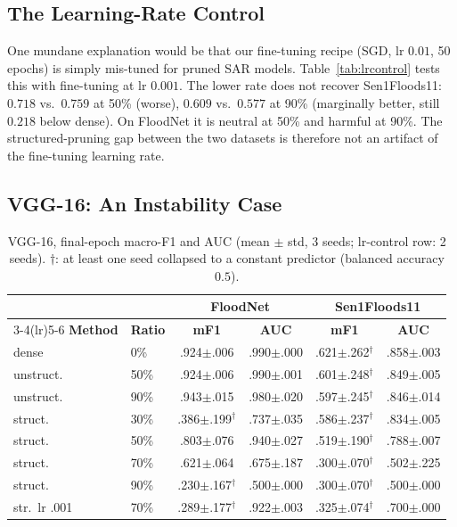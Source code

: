 \documentclass[conference]{IEEEtran}
\begin{document}
\subsection{The Learning-Rate Control}
One mundane explanation would be that our fine-tuning recipe (SGD, lr
$0.01$, 50 epochs) is simply mis-tuned for pruned SAR models.
Table~\ref{tab:lrcontrol} tests this with fine-tuning at lr $0.001$.
The lower rate does not recover Sen1Floods11: $0.718$ vs.\ $0.759$ at
50\% (worse), $0.609$ vs.\ $0.577$ at 90\% (marginally better, still
$0.218$ below dense). On FloodNet it is neutral at 50\% and harmful at
90\%. The structured-pruning gap between the two datasets is therefore
not an artifact of the fine-tuning learning rate.

\subsection{VGG-16: An Instability Case}
\begin{table}[t]
\centering
\caption{VGG-16, final-epoch macro-F1 and AUC (mean $\pm$ std, 3
seeds; lr-control row: 2 seeds). $\dagger$: at least one seed
collapsed to a constant predictor (balanced accuracy $0.5$).}
\label{tab:vgg}
\footnotesize
\setlength{\tabcolsep}{2.6pt}
\begin{tabular}{llcc cc}
\toprule
& & \multicolumn{2}{c}{\textbf{FloodNet}} &
\multicolumn{2}{c}{\textbf{Sen1Floods11}}\\
\cmidrule(lr){3-4}\cmidrule(lr){5-6}
\textbf{Method} & \textbf{Ratio} & \textbf{mF1} & \textbf{AUC} &
\textbf{mF1} & \textbf{AUC}\\
\midrule
dense      & 0\%  & .924$\pm$.006 & .990$\pm$.000 & .621$\pm$.262$^\dagger$ & .858$\pm$.003\\
unstruct.  & 50\% & .924$\pm$.006 & .990$\pm$.001 & .601$\pm$.248$^\dagger$ & .849$\pm$.005\\
unstruct.  & 90\% & .943$\pm$.015 & .980$\pm$.020 & .597$\pm$.245$^\dagger$ & .846$\pm$.014\\
struct.    & 30\% & .386$\pm$.199$^\dagger$ & .737$\pm$.035 & .586$\pm$.237$^\dagger$ & .834$\pm$.005\\
struct.    & 50\% & .803$\pm$.076 & .940$\pm$.027 & .519$\pm$.190$^\dagger$ & .788$\pm$.007\\
struct.    & 70\% & .621$\pm$.064 & .675$\pm$.187 & .300$\pm$.070$^\dagger$ & .502$\pm$.225\\
struct.    & 90\% & .230$\pm$.167$^\dagger$ & .500$\pm$.000 & .300$\pm$.070$^\dagger$ & .500$\pm$.000\\
\midrule
str.\ lr .001 & 70\% & .289$\pm$.177$^\dagger$ & .922$\pm$.003 & .325$\pm$.074$^\dagger$ & .700$\pm$.000\\
\bottomrule
\end{tabular}
\end{table}
\end{document}
